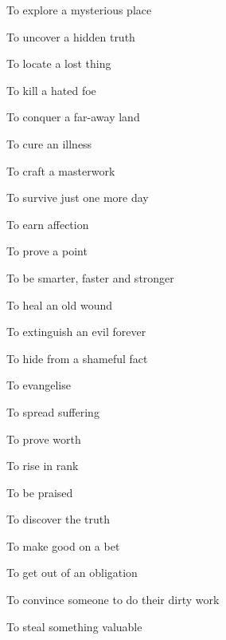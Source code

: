  
\item To explore a mysterious place

 
\item To uncover a hidden truth

 
\item To locate a lost thing

 
\item To kill a hated foe

 
\item To conquer a far-away land

 
\item To cure an illness

 
\item To craft a masterwork

 
\item To survive just one more day

 
\item To earn affection

 
\item To prove a point

 
\item To be smarter, faster and stronger

 
\item To heal an old wound

 
\item To extinguish an evil forever

 
\item To hide from a shameful fact

 
\item To evangelise

 
\item To spread suffering

 
\item To prove worth

 
\item To rise in rank

 
\item To be praised

 
\item To discover the truth

 
\item To make good on a bet

 
\item To get out of an obligation

 
\item To convince someone to do their dirty work

 
\item To steal something valuable

